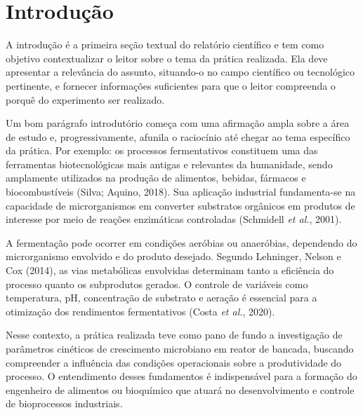 
\section{Introdução}

A introdução é a primeira seção textual do relatório científico e tem como objetivo contextualizar o leitor sobre o tema da prática realizada. Ela deve apresentar a relevância do assunto, situando-o no campo científico ou tecnológico pertinente, e fornecer informações suficientes para que o leitor compreenda o porquê do experimento ser realizado.

Um bom parágrafo introdutório começa com uma afirmação ampla sobre a área de estudo e, progressivamente, afunila o raciocínio até chegar ao tema específico da prática. Por exemplo: os processos fermentativos constituem uma das ferramentas biotecnológicas mais antigas e relevantes da humanidade, sendo amplamente utilizados na produção de alimentos, bebidas, fármacos e biocombustíveis (Silva; Aquino, 2018). Sua aplicação industrial fundamenta-se na capacidade de microrganismos em converter substratos orgânicos em produtos de interesse por meio de reações enzimáticas controladas (Schmidell \textit{et al.}, 2001).

A fermentação pode ocorrer em condições aeróbias ou anaeróbias, dependendo do microrganismo envolvido e do produto desejado. Segundo Lehninger, Nelson e Cox (2014), as vias metabólicas envolvidas determinam tanto a eficiência do processo quanto os subprodutos gerados. O controle de variáveis como temperatura, pH, concentração de substrato e aeração é essencial para a otimização dos rendimentos fermentativos (Costa \textit{et al.}, 2020).

Nesse contexto, a prática realizada teve como pano de fundo a investigação de parâmetros cinéticos de crescimento microbiano em reator de bancada, buscando compreender a influência das condições operacionais sobre a produtividade do processo. O entendimento desses fundamentos é indispensável para a formação do engenheiro de alimentos ou bioquímico que atuará no desenvolvimento e controle de bioprocessos industriais.

